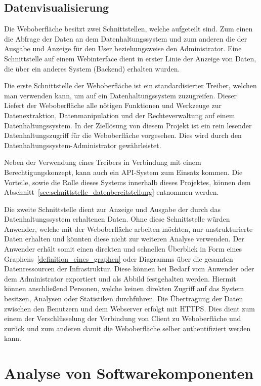 \section{Datenvisualisierung}
Die Weboberfläche besitzt zwei Schnittstellen, welche aufgeteilt sind. Zum
einen die Abfrage der Daten an dem Datenhaltungssystem und zum anderen die der
Ausgabe und Anzeige für den User beziehungsweise den Administrator. Eine
Schnittstelle auf einem Webinterface dient in erster Linie der Anzeige von
Daten, die über ein anderes System (Backend) erhalten wurden.

Die erste Schnittstelle der Weboberfläche ist ein standardisierter Treiber,
welchen man verwenden kann, um auf ein Datenhaltungssystem zuzugreifen. Dieser
Liefert der Weboberfläche alle nötigen Funktionen und Werkzeuge zur
Datenextraktion, Datenmanipulation und der Rechteverwaltung auf einem
Datenhaltungssystem. In der Ziellösung von diesem Projekt ist ein rein
lesender Datenhaltungszugriff für die Weboberfläche vorgesehen. Dies wird durch
den Datenhaltungssystem-Administrator gewährleistet.

Neben der Verwendung eines Treibers in Verbindung mit einem
Berechtigungskonzept, kann auch ein API-System zum Einsatz kommen. Die
Vorteile, sowie die Rolle dieses Systems innerhalb dieses Projektes, können dem
Abschnitt~\ref{sec:schnittstelle_datenbereitstellung} entnommen werden.

Die zweite Schnittstelle dient zur Anzeige und Ausgabe der durch das
Datenhaltungssystem erhaltenen Daten. Ohne diese Schnittstelle würden Anwender,
welche mit der Weboberfläche arbeiten möchten, nur unstrukturierte Daten
erhalten und könnten diese nicht zur weiteren Analyse verwenden. Der Anwender
erhält somit einen direkten und schnellen Überblick in Form eines
Graphens~\ref{definition_eines_graphen} oder Diagramms über die gesamten
Datenressourcen der Infrastruktur. Diese können bei Bedarf vom Anwender oder
dem Administrator exportiert und als Abbild festgehalten werden. Hiermit können
anschließend Personen, welche keinen direkten Zugriff auf das System besitzen,
Analysen oder Statistiken durchführen. Die Übertragung der Daten zwischen den
Benutzern und dem Webserver erfolgt mit \gls{HTTPS}. Dies dient zum einem der
Verschlüsselung der Verbindung von Client zu Weboberfläche und zurück und zum
anderen damit die Weboberfläche selber authentifiziert werden kann.
\mr%

\chapter{Analyse von Softwarekomponenten}
